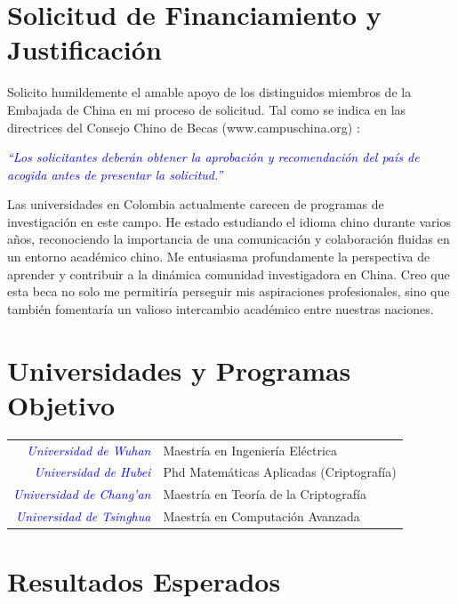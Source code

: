 \documentclass[conference]{IEEEtran}
\begin{document}
\vspace{10pt}
\section{Solicitud de Financiamiento y Justificación}
Solicito humildemente el amable apoyo de los distinguidos miembros de la Embajada de China en mi proceso de solicitud. 
Tal como se indica en las directrices del Consejo Chino de Becas (www.campuschina.org) :

\begin{tcolorbox}[colback=gray!5!white, colframe=gray!10!white, sharp corners]
    \textcolor{blue}{\textit{“Los solicitantes deberán obtener la aprobación y recomendación del país de acogida antes de presentar la solicitud.”}}
\end{tcolorbox}

Las universidades en Colombia actualmente carecen de programas de investigación en este campo. He estado estudiando el idioma chino durante varios años, 
reconociendo la importancia de una comunicación y colaboración fluidas en un entorno académico chino. 
Me entusiasma profundamente la perspectiva de aprender y contribuir a la dinámica comunidad investigadora en China. 
Creo que esta beca no solo me permitiría perseguir mis aspiraciones profesionales, sino que también fomentaría un valioso intercambio académico entre nuestras naciones.

\vspace{10pt}
\section{Universidades y Programas Objetivo}
\begin{tabular}{rl}
    \textcolor{blue}{\small\textit{Universidad de Wuhan}} & {\small Maestría en Ingeniería Eléctrica}\\
    \textcolor{blue}{\small\textit{Universidad de Hubei}} & {\small Phd Matemáticas Aplicadas (Criptografía)}\\
    \textcolor{blue}{\small\textit{Universidad de Chang'an}} & {\small Maestría en Teoría de la Criptografía}\\
    \textcolor{blue}{\small\textit{Universidad de Tsinghua}} & {\small Maestría en Computación Avanzada}
\end{tabular}

\vspace{10pt}
\section{Resultados Esperados}
\end{document}
